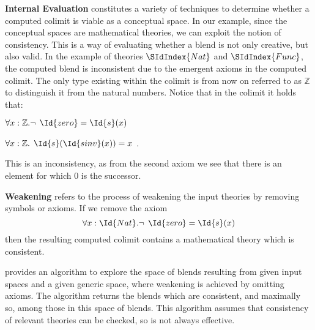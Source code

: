 {\bf Internal Evaluation} constitutes a variety of techniques to determine whether a computed colimit is viable as a conceptual space. In our example, since the conceptual spaces are mathematical theories, we can exploit the notion of consistency. This is a way of evaluating whether a
blend is not only creative, but also valid. In the example of theories
$\SIdIndex{Nat}$ and $\SIdIndex{Func}$,
the computed blend is inconsistent due to the emergent axioms in the
computed colimit. The only type existing within the colimit is from now
on referred to as $\mathbb{Z}$ to distinguish it from the natural
numbers. Notice that in the colimit it holds that:
\begin{center}
  $\forall x: \mathbb{Z}. \neg \:\:   \Id{zero} = \Id{s}(x)$
\end{center}
\begin{center}
  $\forall x: \mathbb{Z}. \:\: \Id{s}(\Id{sinv}(x)) = x$ \:.
\end{center}
This is an inconsistency, as from the second axiom we see 
that there is an
element for which 0 is the successor.

{\bf Weakening} refers to the process of weakening the input
theories by removing symbols or axioms. If we remove the axiom 
$$
\forall x: \Id{Nat}. \neg \:\: \Id{zero} = \Id{s}(x)
$$
then the resulting computed colimit contains a mathematical theory
which is consistent.  

\textcite{MartinezEtAl14} provides an algorithm to explore the space
of blends resulting from given input spaces and a given generic space, where
weakening is achieved by omitting axioms.  The algorithm returns the
blends which are consistent, and maximally so, among those in this
space of blends.  This algorithm assumes that consistency of relevant
theories can be checked, so is not always effective.

